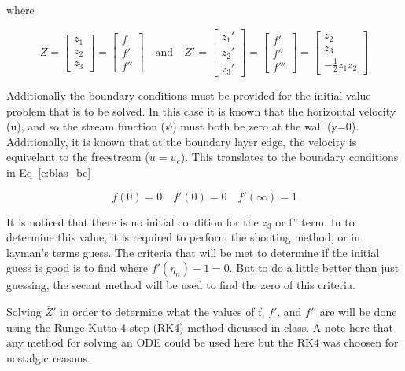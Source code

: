 \documentclass[]{aiaa-tc}%
\begin{document}
where

\begin{equation}
\label{e:blas_cupode}
  \bar Z = \begin{bmatrix}
    z_1 \\ z_2 \\ z_3
  \end{bmatrix} =
  \begin{bmatrix}
    f \\ f' \\ f''
  \end{bmatrix}
  \quad \textrm{and} \quad
  \bar Z' = \begin{bmatrix}
    z_1' \\ z_2' \\ z_3'
  \end{bmatrix} =
  \begin{bmatrix}
    f' \\ f'' \\ f'''
  \end{bmatrix} =
  \begin{bmatrix}
    z_2 \\ z_3 \\ - \frac{1}{2} z_1 z_2
  \end{bmatrix}
\end{equation}

Additionally the boundary conditions must be provided for the initial value problem
that is to be solved. In this case it is known that the horizontal velocity (u), and so the stream
function ($\psi$) must both be zero at the wall (y=0). Additionally, it is known that
at the boundary layer edge, the velocity is equivelant to the freestream ($u=u_e$).
This translates to the boundary conditions in Eq~\ref{e:blas_bc}

\begin{equation}
  \label{e:blas_bc}
  f(0) = 0 \quad f'(0) = 0 \quad f'(\infty) = 1
\end{equation}

It is noticed that there is no initial condition for the $z_3$ or f'' term. In
to determine this value, it is required to perform the shooting method, or in
layman's terms guess. The criteria that will be met to
determine if the initial guess is good is to find where $f'(\eta_n) - 1 = 0$.
But to do a little better than just guessing, the secant method
will be used to find the zero of this criteria.

Solving $\bar Z'$ in order to determine what the values of f, $f'$, and $f''$ are
will be done using the Runge-Kutta 4-step (RK4) method dicussed in class. A note here
that any method for solving an ODE could be used here but the RK4 was choosen for
nostalgic reasons.
\end{document}
